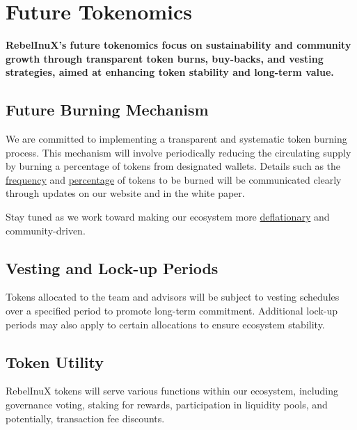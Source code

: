 \documentclass{article}
\begin{document}
\section[
  \texorpdfstring{\color{primaryColor}Future Tokenomics}{Future Tokenomics}
]{\color{primaryColor}\textbf{Future Tokenomics}}
\begin{tcolorbox}[colback=headerColor!10!white, colframe=headerColor, boxrule=2pt, width=\textwidth, arc=6mm, left=8mm, right=8mm, top=6mm, bottom=6mm]
\textbf{RebelInuX's future tokenomics focus on sustainability and community growth through transparent token burns, buy-backs, and vesting strategies, aimed at enhancing token stability and long-term value.}

\subsection[
  \texorpdfstring{\color{primaryColor}Future Burning Mechanism}{Future Burning Mechanism}
]{\color{primaryColor}Future Burning Mechanism}
We are committed to implementing a transparent and systematic token burning process. This mechanism will involve periodically reducing the circulating supply by burning a percentage of tokens from designated wallets. Details such as the \underline{frequency} and \underline{percentage} of tokens to be burned will be communicated clearly through updates on our website and in the white paper.

Stay tuned as we work toward making our ecosystem more \underline{deflationary} and community-driven.

\subsection[
  \texorpdfstring{\color{primaryColor}Vesting and Lock-up Periods}{Vesting and Lock-up Periods}
]{\color{primaryColor}Vesting and Lock-up Periods}
Tokens allocated to the team and advisors will be subject to vesting schedules over a specified period to promote long-term commitment. Additional lock-up periods may also apply to certain allocations to ensure ecosystem stability.

\subsection[
  \texorpdfstring{\color{primaryColor}Token Utility}{Token Utility}
]{\color{primaryColor}Token Utility}
RebelInuX tokens will serve various functions within our ecosystem, including governance voting, staking for rewards, participation in liquidity pools, and potentially, transaction fee discounts.

\end{tcolorbox}
\end{document}
